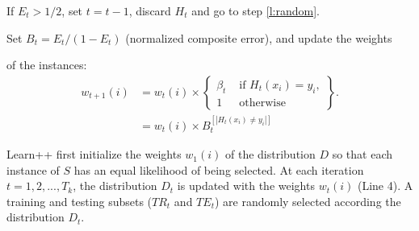 \begin{algorithm}[]
{\begin{minipage}{0.97\linewidth}
\begin{algorithmic}[1]
				  \vspace{-10pt}\hspace{14pt}If $E_t>1/2$, set $t=t-1$, discard $H_t$ 
				  and go to step \ref{l:random}.\vspace{8pt}
				
				\State Set $B_t=E_t / (1-E_t)$ (normalized composite error), and update 
							 the weights
							 
							 \hspace{14pt}of the instances:\vspace{-10pt}				
				\begin{equation*}
					\begin{split}
							w_{t+1}(i) & =w_t(i) \times \left\{ \begin{array}{rl}
													 \beta_t &\mbox{ if $H_t(x_i)=y_i$}, \\  
													 1       &\mbox{ otherwise}\end{array} \right\}.	\\											           & =w_t(i) \times 
													        B_t^{\left[|H_t(x_i)\neq y_i | \right]}
					\end{split}
				\end{equation*}
				
				\EndFor
			\EndFor 
	\end{algorithmic}
	\end{minipage} }
\end{algorithm}

Learn++ first initialize the weights $w_1(i)$ of the distribution $D$ so that each instance of $S$ has an equal likelihood of being selected.
At each iteration $t=1,2,...,T_k$, the distribution $D_t$ is updated with the weights $w_t(i)$ (Line 4).
A training and testing subsets ($TR_t$ and $TE_t$) are randomly selected according the distribution $D_t$.

